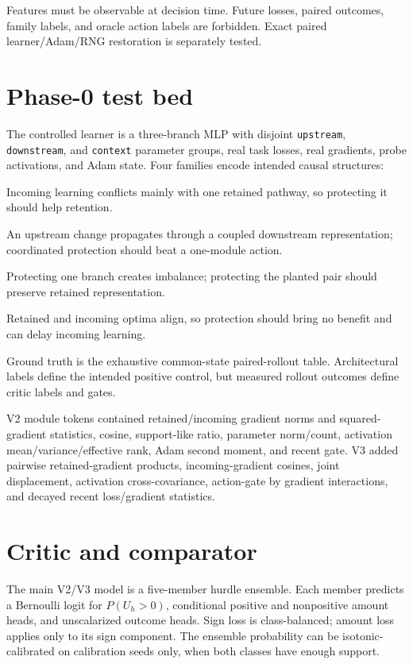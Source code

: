 \documentclass[11pt]{article}
\begin{document}
Features must be observable at decision time. Future losses, paired outcomes, family labels, and oracle action labels are forbidden. Exact paired learner/Adam/RNG restoration is separately tested.

\section{Phase-0 test bed}
The controlled learner is a three-branch MLP with disjoint \texttt{upstream}, \texttt{downstream}, and \texttt{context} parameter groups, real task losses, real gradients, probe activations, and Adam state. Four families encode intended causal structures:
\begin{description}[style=nextline]
\item[Local-specific] Incoming learning conflicts mainly with one retained pathway, so protecting it should help retention.
\item[Downstream chain] An upstream change propagates through a coupled downstream representation; coordinated protection should beat a one-module action.
\item[Synergistic pair] Protecting one branch creates imbalance; protecting the planted pair should preserve retained representation.
\item[Null or harmful] Retained and incoming optima align, so protection should bring no benefit and can delay incoming learning.
\end{description}
Ground truth is the exhaustive common-state paired-rollout table. Architectural labels define the intended positive control, but measured rollout outcomes define critic labels and gates.

V2 module tokens contained retained/incoming gradient norms and squared-gradient statistics, cosine, support-like ratio, parameter norm/count, activation mean/variance/effective rank, Adam second moment, and recent gate. V3 added pairwise retained-gradient products, incoming-gradient cosines, joint displacement, activation cross-covariance, action-gate by gradient interactions, and decayed recent loss/gradient statistics.

\section{Critic and comparator}
The main V2/V3 model is a five-member hurdle ensemble. Each member predicts a Bernoulli logit for $P(U_h>0)$, conditional positive and nonpositive amount heads, and unscalarized outcome heads. Sign loss is class-balanced; amount loss applies only to its sign component. The ensemble probability can be isotonic-calibrated on calibration seeds only, when both classes have enough support.
\end{document}
